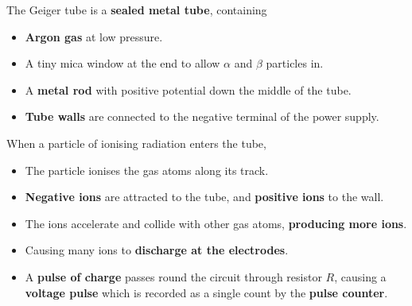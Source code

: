The Geiger tube is a \textbf{sealed metal tube}, containing
\begin{itemize}
    \item \textbf{Argon gas} at low pressure.
    \item A tiny mica window at the end to allow $\alpha$ and $\beta$ particles in.
    \item A \textbf{metal rod} with positive potential down the middle of the tube.
    \item \textbf{Tube walls} are connected to the negative terminal of the power supply.
\end{itemize}

When a particle of ionising radiation enters the tube,
\begin{itemize}
    \item The particle ionises the gas atoms along its track.
    \item \textbf{Negative ions} are attracted to the tube, and \textbf{positive ions} to the wall.
    \item The ions accelerate and collide with other gas atoms, \textbf{producing more ions}.
    \item Causing many ions to \textbf{discharge at the electrodes}.
    \item A \textbf{pulse of charge} passes round the circuit through resistor $R$, causing a \textbf{voltage pulse} which is recorded as a single count by the \textbf{pulse counter}.
\end{itemize}
